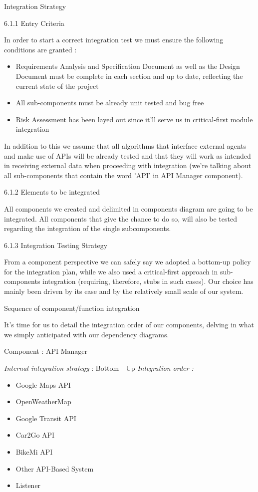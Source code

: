 Integration Strategy

6.1.1 Entry Criteria

In order to start a correct integration test we must ensure the following conditions are granted :

\begin{itemize}

	\item Requirements Analysis and Specification Document as well as the Design Document must be complete in each section and up to date, reflecting the current state of the project
	\item All sub-components must be already unit tested and bug free
	\item Risk Assessment has been layed out since it'll serve us in critical-first module integration

\end{itemize}

In addition to this we assume that all algorithms that interface external agents and make use of APIs will be already tested and that they will work as intended in receiving external data when proceeding with integration (we're talking about all sub-components that contain the word 'API' in API Manager component).


6.1.2 Elements to be integrated

All components we created and delimited in components diagram are going to be integrated. All components that give the chance to do so, will also be tested regarding the integration of the single subcomponents.

6.1.3 Integration Testing Strategy

From a component perspective we can safely say we adopted a bottom-up policy for the integration plan, while we also used a critical-first approach in sub-components integration (requiring, therefore, stubs in such cases). 
Our choice has mainly been driven by its ease and by the relatively small scale of our system.

Sequence of component/function integration

It's time for us to detail the integration order of our components, delving in what we simply anticipated with our dependency diagrams.



Component : API Manager

\textit{Internal integration strategy} : Bottom - Up
\textit{Integration order :}
	\begin{itemize}
		\item Google Maps API
		\item OpenWeatherMap
		\item Google Transit API
		\item Car2Go API
		\item BikeMi API
		\item Other API-Based System
		\item Listener
	\end{itemize}


